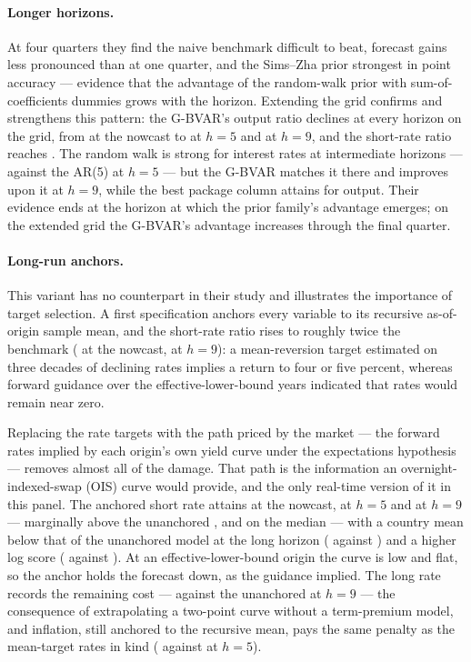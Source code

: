 \paragraph{Longer horizons.} At four quarters they find the naive benchmark difficult to
beat, forecast gains less pronounced than at one quarter, and the Sims--Zha prior
strongest in point accuracy --- evidence that the advantage of the random-walk prior with
sum-of-coefficients dummies grows with the horizon. Extending the grid confirms and
strengthens this pattern: the G-BVAR's output ratio declines at every horizon on the
grid, from \CmGbvarYHOne{} at the nowcast to \CmGbvarYHFive{} at $h=5$ and
\CmGbvarYHNine{} at $h=9$, and the short-rate ratio reaches \CmGbvarRHNine{}. The random
walk is strong for interest rates at intermediate horizons --- \CmRwRHFive{} against the
AR(5) at $h=5$ --- but the G-BVAR matches it there and improves upon it at $h=9$, while
the best package column attains \CmMnYHNine{} for output. Their evidence ends at the
horizon at which the prior family's advantage emerges; on the extended grid the G-BVAR's
advantage increases through the final quarter.

\paragraph{Long-run anchors.} This variant has no counterpart in their study and
illustrates the importance of target selection. A first specification anchors every
variable to its recursive as-of-origin sample mean, and the short-rate ratio rises to
roughly twice the benchmark (\CmAnchMeanRHOne{} at the nowcast, \CmAnchMeanRHNine{} at
$h=9$): a mean-reversion target estimated on three decades of declining rates implies a
return to four or five percent, whereas forward guidance over the effective-lower-bound
years indicated that rates would remain near zero.

Replacing the rate targets with the path priced by the market --- the forward rates
implied by each origin's own yield curve under the expectations hypothesis --- removes
almost all of the damage. That path is the information an overnight-indexed-swap (OIS)
curve would provide, and the only real-time version of it in this panel. The anchored
short rate attains \CmAnchRHOne{} at the nowcast, \CmAnchRHFive{} at $h=5$ and
\CmAnchRHNine{} at $h=9$ --- marginally above the unanchored \CmGbvarRHOne{},
\CmGbvarRHFive{} and \CmGbvarRHNine{} on the median --- with a country mean below that of
the unanchored model at the long horizon (\CmAnchRMeanHNine{} against
\CmGbvarRMeanHNine{}) and a higher log score (\CmAnchRLpsHNine{} against
\CmGbvarRLpsHNine{}). At an effective-lower-bound origin the curve is low and flat, so
the anchor holds the forecast down, as the guidance implied. The long rate records the
remaining cost --- \CmAnchLrHNine{} against the unanchored \CmGbvarLrHNine{} at $h=9$ ---
the consequence of extrapolating a two-point curve without a term-premium model, and
inflation, still anchored to the recursive mean, pays the same penalty as the mean-target
rates in kind (\CmAnchDpHFive{} against \CmGbvarDpHFive{} at $h=5$).

